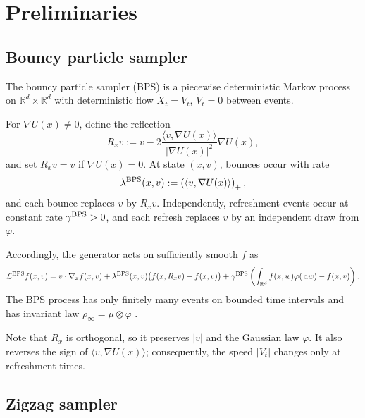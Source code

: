 \documentclass{amsart}
\theoremstyle{plain}
\theoremstyle{definition}
\theoremstyle{remark}
\newcommand{\ud}{\,\mathrm{d}}
\newcommand{\RR}{\mathbb{R}}
\newcommand{\abs}[1]{\lvert#1\rvert}
\newcommand{\R}{\RR}
\newcommand{\1}{\mathbf 1}
\newcommand{\dd}{\ud}
\newcommand{\ip}[2]{\langle #1,#2\rangle}
\newcommand{\pos}[1]{\left(#1\right)_+}
\newcommand{\bps}{{\rm BPS}}
\begin{document}
\section{Preliminaries}\label{sec:prelim}

\subsection{Bouncy particle sampler}\label{ssec:bps}

The bouncy particle sampler (BPS) is a piecewise deterministic Markov process
on $\R^d\times\R^d$ with deterministic flow
$\dot X_t=V_t$, $\dot V_t=0$ between events.

For $\nabla U(x)\neq 0$, define the reflection
\begin{equation}\label{eq:reflection}
R_x v
:=
v-2\frac{\langle v,\nabla U(x)\rangle}
{\abs{\nabla U(x)}^2}\nabla U(x),
\end{equation}
and set $R_x v=v$ if $\nabla U(x)=0$.  At state $(x,v)$, bounces occur with
rate
\[
\lambda^{\bps}(x,v)
:=
\pos{\ip{v}{\nabla U(x)}},
\]
and each bounce replaces $v$ by $R_xv$.  Independently, refreshment events
occur at constant rate $\gamma^{\bps}>0$, and each refresh replaces $v$ by an
independent draw from $\varphi$.

Accordingly, the generator acts on sufficiently smooth $f$ as
\begin{equation}\label{eq:bps-generator}
\mathcal L^{\bps} f(x,v)
=
v\cdot\nabla_x f(x,v)
+
\lambda^{\bps}(x,v)\bigl(f(x,R_x v)-f(x,v)\bigr)
+
\gamma^{\bps}\left(
  \int_{\R^d}f(x,w)\varphi(\dd w)-f(x,v)
\right).
\end{equation}
The BPS process has only finitely many events on bounded time intervals and
has invariant law $\rho_\infty=\mu\otimes\varphi$
\cite{BouchardCoteVollmerDoucet}.

Note that $R_x$ is orthogonal, so
it preserves $\abs v$ and the Gaussian law $\varphi$.  It also reverses the
sign of $\ip{v}{\nabla U(x)}$; consequently, the speed $\abs{V_t}$ changes
only at refreshment times.  

\subsection{Zigzag sampler}\label{ssec:zz}
\end{document}
